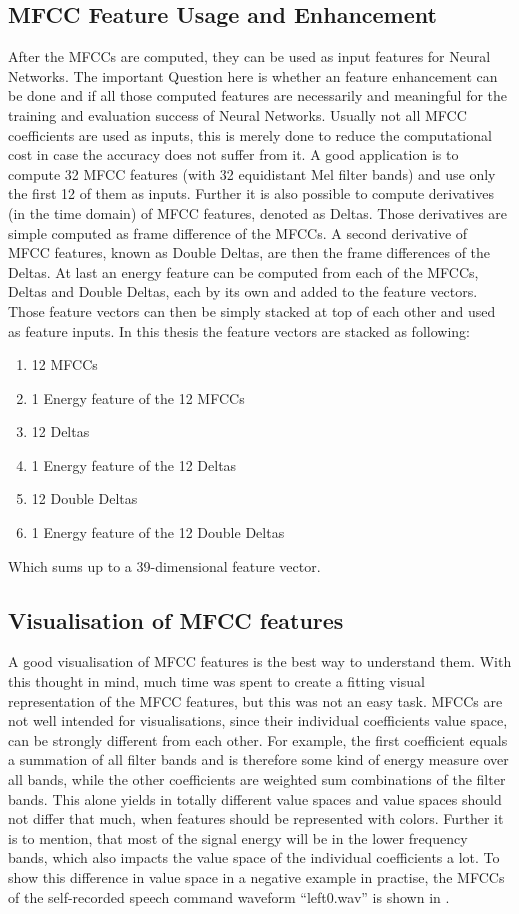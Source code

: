 \subsection{MFCC Feature Usage and Enhancement}
After the MFCCs are computed, they can be used as input features for Neural Networks. 
The important Question here is whether an feature enhancement can be done and if all those computed features are necessarily and meaningful for the training and evaluation success of Neural Networks. Usually not all MFCC coefficients are used as inputs, this is merely done to reduce the computational cost in case the accuracy does not suffer from it.
A good application is to compute 32 MFCC features (with 32 equidistant Mel filter bands) and use only the first 12 of them as inputs.
Further it is also possible to compute derivatives (in the time domain) of MFCC features, denoted as Deltas. 
Those derivatives are simple computed as frame difference of the MFCCs.
A second derivative of MFCC features, known as Double Deltas, are then the frame differences of the Deltas.
At last an energy feature can be computed from each of the MFCCs, Deltas and Double Deltas, each by its own and added to the feature vectors.
Those feature vectors can then be simply stacked at top of each other and used as feature inputs.
In this thesis the feature vectors are stacked as following:
\begin{enumerate}
    \item 12 MFCCs
    \item 1 Energy feature of the 12 MFCCs
    \item 12 Deltas
    \item 1 Energy feature of the 12 Deltas
    \item 12 Double Deltas
    \item 1 Energy feature of the 12 Double Deltas
\end{enumerate}
Which sums up to a 39-dimensional feature vector.

\subsection{Visualisation of MFCC features}
A good visualisation of MFCC features is the best way to understand them.
With this thought in mind, much time was spent to create a fitting visual representation of the MFCC features, but this was not an easy task.
MFCCs are not well intended for visualisations, since their individual coefficients value space, can be strongly different from each other.
For example, the first coefficient equals a summation of all filter bands and is therefore some kind of energy measure over all bands, while the other coefficients are weighted sum combinations of the filter bands.
This alone yields in totally different value spaces and value spaces should not differ that much, when features should be represented with colors.
Further it is to mention, that most of the signal energy will be in the lower frequency bands, which also impacts the value space of the individual coefficients a lot.
To show this difference in value space in a negative example in practise, the MFCCs of the self-recorded speech command waveform \enquote{left0.wav} is shown in .

